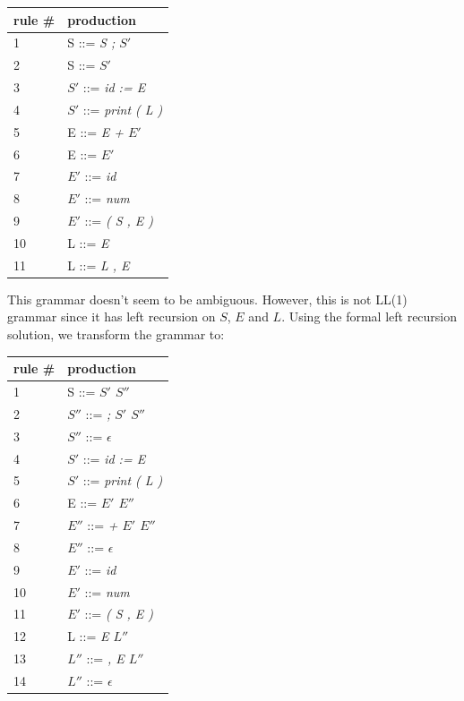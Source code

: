 \documentclass{article}
\begin{document}
    \begin{center}
        \begin{tabular}{ l l }
        \hline
        rule \# & production \\
        \hline
        1   &   S   ::= \textit{S ; $S'$} \\
        2   &   S   ::= \textit{$S'$} \\
        3   &   $S'$  ::= \textit{id := E} \\
        4   &   $S'$  ::= \textit{print ( L )} \\
        5   &   E   ::= \textit{E + $E'$} \\
        6   &   E   ::= \textit{$E'$} \\
        7   &   $E'$  ::= \textit{id} \\
        8   &   $E'$  ::= \textit{num} \\
        9   &   $E'$  ::= \textit{( S , E )} \\
        10  &   L   ::= \textit{E} \\
        11  &   L   ::= \textit{L , E} \\
        \end{tabular}
    \end{center}

    This grammar doesn't seem to be ambiguous. However, this is not LL(1) grammar since it has left recursion on $S$, $E$ and $L$. Using the formal left recursion solution, we transform the grammar to:

    \begin{center}
        \begin{tabular}{ l l }
        \hline
        rule \# & production \\
        \hline
        1   &   S   ::= \textit{$S'$ $S''$} \\
        2   &   $S''$ ::= \textit{; $S'$ $S''$} \\
        3   &   $S''$ ::= $\epsilon$ \\
        4   &   $S'$  ::= \textit{id := E} \\
        5   &   $S'$  ::= \textit{print ( L )} \\
        6   &   E   ::= \textit{$E'$ $E''$} \\
        7   &   $E''$ ::= \textit{+ $E'$ $E''$} \\
        8   &   $E''$ ::= $\epsilon$ \\
        9   &   $E'$  ::= \textit{id} \\
        10  &   $E'$  ::= \textit{num} \\
        11  &   $E'$  ::= \textit{( S , E )} \\
        12  &   L   ::= \textit{E $L''$} \\
        13  &   $L''$ ::= \textit{, E $L''$} \\
        14  &   $L''$ ::= $\epsilon$ \\
        \end{tabular}
    \end{center}
\end{document}
